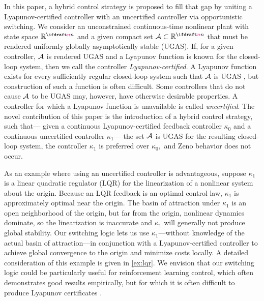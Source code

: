 In this paper, a hybrid control strategy 
is proposed to fill that gap by uniting a 
Lyapunov-certified controller with an uncertified controller
via opportunistic switching.
We consider an unconstrained 
continuous-time nonlinear plant
with state space $\reals^\nplant$ and a given compact set 
$\calA\subset\reals^\nplant$ that must be rendered
uniformly globally asymptotically stable (UGAS).
If, for a given controller, ${\mathcal{A}}$ is rendered UGAS 
and a Lyapunov function is known for the closed-loop system, 
then we call the controller \emph{Lyapunov-certified}.
A Lyapunov function exists for every 
sufficiently regular
closed-loop system such that ${\mathcal{A}}$ is 
UGAS \cite[Theorem 4.17]{khalil_nonlinear_2014},
but construction of such a function 
is often difficult. 
Some controllers that do not cause ${\mathcal{A}}$ to be UGAS may, however, 
have otherwise desirable properties.
A controller for 
which a Lyapunov function is unavailable
is called \emph{uncertified}.
The novel contribution of this paper is the introduction of
a hybrid control strategy, such that---%
given a continuous Lyapunov-certified 
feedback controller $\kappa_0$
and a continuous uncertified controller $\kappa_1$---%
the set ${\mathcal{A}}$ is UGAS for the
resulting closed-loop system, 
the controller $\kappa_1$ is preferred over $\kappa_0,$
and Zeno behavior does not occur.

As an example where using an uncertified controller is advantageous, 
suppose $\kappa_1$ is a linear quadratic regulator (LQR) 
for the linearization of a nonlinear system about the origin. 
Because an LQR feedback is an optimal control law, 
$\kappa_1$ is approximately optimal  near the origin. 
The basin of attraction under $\kappa_1$ 
is an open neighborhood of the origin, but
far from the origin, nonlinear dynamics dominate, 
so the linearization is inaccurate and
$\kappa_1$ will generally not produce global stability.
Our switching logic lets us use $\kappa_1$---without knowledge 
of the actual basin of attraction---in conjunction with a Lyapunov-certified
controller to achieve global convergence to the origin and minimize costs locally.
A detailed consideration of this example is given 
in \cref{ex:lqr}.
We envision
that our switching logic could be particularly useful %
for reinforcement learning control,
which often demonstrates good results empirically, 
but for which it is often difficult to produce Lyapunov 
certificates \cite{dai_lyapunov-stable_2021}.

